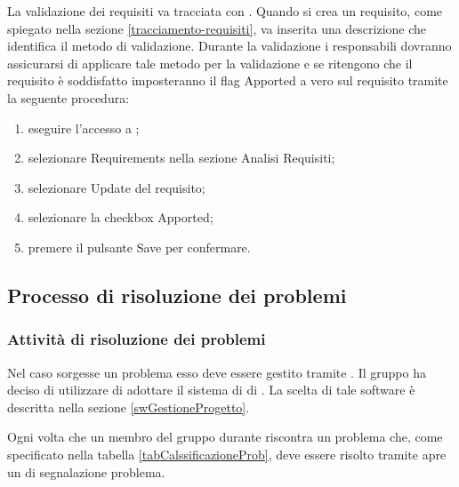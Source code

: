\documentclass[12pt,a4paper]{article}
\begin{document}
La validazione dei requisiti va tracciata con . Quando si crea un requisito, come spiegato nella sezione \ref{tracciamento-requisiti}, va inserita una descrizione che identifica il metodo di validazione. Durante la validazione i responsabili dovranno assicurarsi di applicare tale metodo per la validazione e se ritengono che il requisito è soddisfatto imposteranno il flag Apported a vero sul requisito tramite la seguente procedura:
\begin{enumerate}
	\item eseguire l'accesso a ;
	\item selezionare Requirements nella sezione Analisi Requisiti;
	\item selezionare Update del requisito;
	\item selezionare la checkbox Apported;
	\item premere il pulsante Save per confermare.
\end{enumerate}

\subsection{Processo di risoluzione dei problemi}

\subsubsection{Attività di risoluzione dei problemi} \label{gestioneDeiProblemi}
Nel caso sorgesse un problema esso deve essere gestito tramite . Il gruppo ha deciso di utilizzare  di adottare il sistema di  di . La scelta di tale software è descritta nella sezione \ref{swGestioneProgetto}.

Ogni volta che un membro del gruppo durante riscontra un problema che, come specificato nella tabella \ref{tabCalssificazioneProb}, deve essere risolto tramite  apre un  di segnalazione problema.
\end{document}
